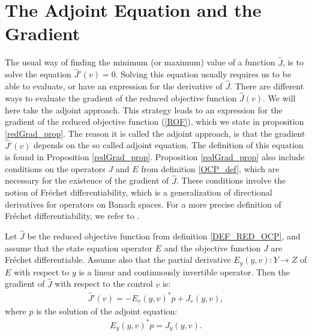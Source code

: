 \section{The Adjoint Equation and the Gradient} \label{adjointGrad_sec}
The usual way of finding the minimum (or maximum) value of a function $\hat J$, is to solve the equation $\hat J'(v)=0$. Solving this equation usually requires us to be able to evaluate, or have an expression for the derivative of $\hat J$. There are different ways to evaluate the gradient of the reduced objective function $\hat J(v)$. We will here take the adjoint approach. This strategy leads to an expression for the gradient of the reduced objective function (\ref{ROF}), which we state in proposition \ref{redGrad_prop}. The reason it is called the adjoint approach, is that the gradient $\hat J'(v)$ depends on the so called adjoint equation. The definition of this equation is found in Proposition \ref{redGrad_prop}. Proposition \ref{redGrad_prop} also include conditions on the operators $J$ and $E$ from definition \ref{OCP_def}, which are necessary for the existence of the gradient of $\hat J$. These conditions involve the notion of Fr\'{e}chet differentiability, which is a generalization of directional derivatives for operators on Banach spaces. For a more precise definition of Fr\'{e}chet differentiability, we refer to \cite{hinze2008optimization}.
\begin{proposition} \label{redGrad_prop}
Let $\hat J$ be the reduced objective function from definition \ref{DEF_RED_OCP}, and assume that the state equation operator $E$ and the objective function $J$ are Fr\'{e}chet differentiable. Assume also that the partial derivative $E_y(y,v):Y\rightarrow Z$ of $E$ with respect to $y$ is a linear and continuously invertible operator. Then the gradient of $\hat J$ with respect to the control $v$ is:
\begin{align}
\hat J'(v) = -E_v(y,v)^*p + J_v(y,v),\label{gradient}
\end{align}
where $p$ is the solution of the adjoint equation:
\begin{align}
E_y(y,v)^{*}p=J_y(y,v). \label{general adjoint}
\end{align}
\end{proposition}
